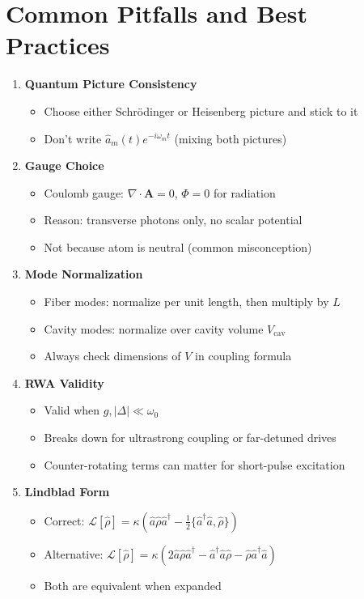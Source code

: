 \documentclass[12pt,a4paper]{article}
\begin{document}
\section{Common Pitfalls and Best Practices}

\begin{enumerate}[leftmargin=*]
\item \textbf{Quantum Picture Consistency}
\begin{itemize}
\item Choose either Schrödinger or Heisenberg picture and stick to it
\item Don't write $\hat{a}_m(t)e^{-i\omega_m t}$ (mixing both pictures)
\end{itemize}

\item \textbf{Gauge Choice}
\begin{itemize}
\item Coulomb gauge: $\nabla \cdot \mathbf{A} = 0$, $\Phi = 0$ for radiation
\item Reason: transverse photons only, no scalar potential
\item Not because atom is neutral (common misconception)
\end{itemize}

\item \textbf{Mode Normalization}
\begin{itemize}
\item Fiber modes: normalize per unit length, then multiply by $L$
\item Cavity modes: normalize over cavity volume $V_{\text{cav}}$
\item Always check dimensions of $V$ in coupling formula
\end{itemize}

\item \textbf{RWA Validity}
\begin{itemize}
\item Valid when $g, |\Delta| \ll \omega_0$
\item Breaks down for ultrastrong coupling or far-detuned drives
\item Counter-rotating terms can matter for short-pulse excitation
\end{itemize}

\item \textbf{Lindblad Form}
\begin{itemize}
\item Correct: $\mathcal{L}[\hat{\rho}] = \kappa(\hat{a}\hat{\rho}\hat{a}^\dagger - \frac{1}{2}\{\hat{a}^\dagger\hat{a}, \hat{\rho}\})$
\item Alternative: $\mathcal{L}[\hat{\rho}] = \kappa(2\hat{a}\hat{\rho}\hat{a}^\dagger - \hat{a}^\dagger\hat{a}\hat{\rho} - \hat{\rho}\hat{a}^\dagger\hat{a})$
\item Both are equivalent when expanded
\end{itemize}


\end{enumerate}
\end{document}
